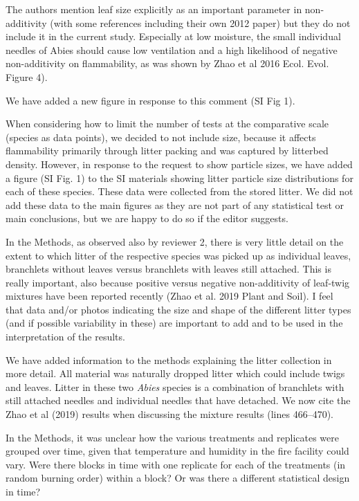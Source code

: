 \documentclass[letterpaper, 12pt]{letter}
\begin{document}
\begin{letter}{}
\begin{quoting}
  The authors mention leaf size explicitly as an important parameter in
  non-additivity (with some references including their own 2012 paper) but they
  do not include it in the current study. Especially at low moisture, the small
  individual needles of Abies should cause low ventilation and a high
  likelihood of negative non-additivity on flammability, as was shown by Zhao
  et al 2016 Ecol. Evol. Figure 4).
\end{quoting}

We have added a new figure in response to this comment (SI Fig 1).

When considering how to limit the number of tests at the comparative scale
(species as data points), we decided to not include size, because it affects
flammability primarily through litter packing and was captured by litterbed
density. However, in response to the request to show particle sizes, we have
added a figure (SI Fig. 1) to the SI materials showing litter particle size
distributions for each of these species. These data were collected from the
stored litter. We did not add these data to the main figures as they are not
part of any statistical test or main conclusions, but we are happy to do so if
the editor suggests.


\begin{quoting}
  In the Methods, as observed also by reviewer 2, there is very little detail
  on the extent to which litter of the respective species was picked up as
  individual leaves, branchlets without leaves versus branchlets with leaves
  still attached. This is really important, also because positive versus
  negative non-additivity of leaf-twig mixtures have been reported recently
  (Zhao et al. 2019 Plant and Soil). I feel that data and/or photos indicating
  the size and shape of the different litter types (and if possible variability
  in these) are important to add and to be used in the interpretation of the
  results.
\end{quoting}

We have added information to the methods explaining the litter collection in
more detail. All material was naturally dropped litter which could include
twigs and leaves. Litter in these two \emph{Abies} species is a combination of
branchlets with still attached needles and individual needles that have
detached. We now cite the Zhao et al (2019) results when discussing the mixture
results (lines 466--470).

\begin{quoting}
  In the Methods, it was unclear how the various treatments and replicates were
  grouped over time, given that temperature and humidity in the fire facility
  could vary. Were there blocks in time with one replicate for each of the
  treatments (in random burning order) within a block? Or was there a different
  statistical design in time?
\end{quoting}


\end{letter}
\end{document}
